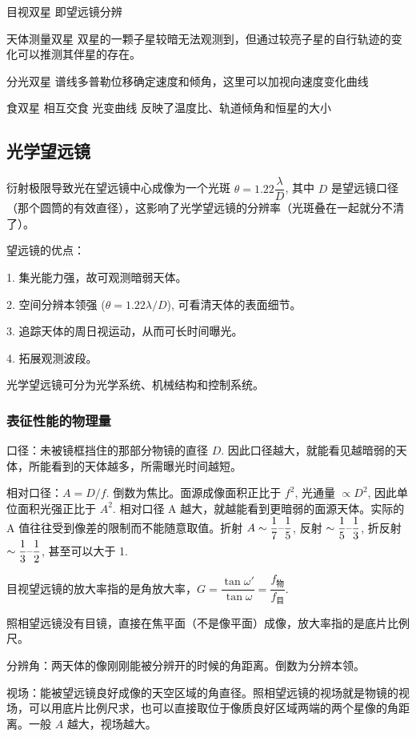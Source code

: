 \documentclass[UTF8, 12pt, a4paper, oneside, onecolumn, fontset=none]{ctexart}
\begin{document}
目视双星 即望远镜分辨

天体测量双星 双星的一颗子星较暗无法观测到，但通过较亮子星的自行轨迹的变化可以推测其伴星的存在。

分光双星 谱线多普勒位移确定速度和倾角，这里可以加视向速度变化曲线 

食双星 相互交食 光变曲线 反映了温度比、轨道倾角和恒星的大小


\subsection{光学望远镜}
衍射极限导致光在望远镜中心成像为一个光斑 $\theta=1.22\dfrac{\lambda}{D}$, 其中 $D$ 是望远镜口径（那个圆筒的有效直径），这影响了光学望远镜的分辨率（光斑叠在一起就分不清了）。

望远镜的优点：

1. 集光能力强，故可观测暗弱天体。

2. 空间分辨本领强 ($\theta=1.22\lambda/D$), 可看清天体的表面细节。

3. 追踪天体的周日视运动，从而可长时间曝光。

4. 拓展观测波段。

光学望远镜可分为光学系统、机械结构和控制系统。

\subsubsection{表征性能的物理量}
口径：未被镜框挡住的那部分物镜的直径 $D$. 因此口径越大，就能看见越暗弱的天体，所能看到的天体越多，所需曝光时间越短。

相对口径：$A=D/f$. 倒数为焦比。面源成像面积正比于 $f^{2}$, 光通量 $\propto{}D^{2}$, 因此单位面积光强正比于 $A^{2}$. 相对口径 A 越大，就越能看到更暗弱的面源天体。实际的 A 值往往受到像差的限制而不能随意取值。折射 $A\sim\dfrac{1}{7}\text{\textendash}\dfrac{1}{5}$, 反射 $\sim\dfrac{1}{5}\text{\textendash}\dfrac{1}{3}$, 折反射 $\sim\dfrac{1}{3}\text{\textendash}\dfrac{1}{2}$, 甚至可以大于 1.

目视望远镜的放大率指的是角放大率，$G=\dfrac{\tan{\omega'}}{\tan{\omega}}=\dfrac{f_{\text{物}}}{f_{\text{目}}}$.

照相望远镜没有目镜，直接在焦平面（不是像平面）成像，放大率指的是底片比例尺。

分辨角：两天体的像刚刚能被分辨开的时候的角距离。倒数为分辨本领。

视场：能被望远镜良好成像的天空区域的角直径。照相望远镜的视场就是物镜的视场，可以用底片比例尺求，也可以直接取位于像质良好区域两端的两个星像的角距离。一般 $A$ 越大，视场越大。
\end{document}
